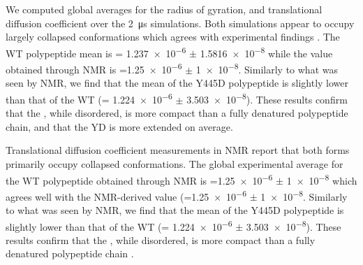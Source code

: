 We computed global averages for the radius of gyration, and translational diffusion coefficient over the \SI{2}{\us} simulations. Both simulations appear to occupy largely collapsed conformations which agrees with experimental findings . The WT polypeptide \diffusion mean is \diffusion = \num{1.237e-6} $\pm$ \SI{1.5816e-8}{\dcunits} while the value obtained through NMR is  \diffusion=\num{1.25e-6} $\pm$  \SI{1e-8}{\dcunits}. Similarly to what was seen by NMR, we find that the mean \diffusion of the Y445D \gct polypeptide is slightly lower than that of the WT \gct (\diffusion= \num{1.224e-6} $\pm$ \SI{3.503e-8}{\dcunits}). These results confirm that the \gct, while disordered, is more compact than a fully denatured polypeptide chain, and that the YD \gct is more extended on average.



\begin{figure}
	\centering     %
	\label{fig:fm}
\end{figure}

Translational diffusion coefficient measurements in NMR report that both \gct forms primarily occupy collapsed conformations. The global experimental average for the WT polypeptide obtained through NMR is \diffusion=\num{1.25e-6} $\pm$  \SI{1e-8}{\dcunits} which agrees well with the NMR-derived value (\diffusion=\num{1.25e-6} $\pm$  \SI{1e-8}{\dcunits}. Similarly to what was seen by NMR, we find that the mean \diffusion of the Y445D \gct polypeptide is slightly lower than that of the WT \gct (\diffusion= \num{1.224e-6} $\pm$ \SI{3.503e-8}{\dcunits}). These results confirm that the \gct, while disordered, is more compact than a fully denatured polypeptide chain . 

